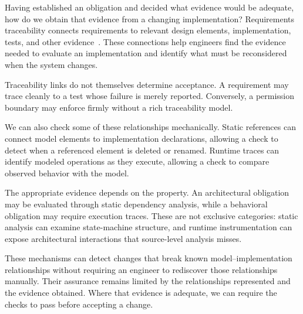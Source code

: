 Having established an obligation and decided what evidence would be adequate, how do we obtain that evidence from a changing implementation? Requirements traceability connects requirements to relevant design elements, implementation, tests, and other evidence~\citep{estefan2008mbse}. These connections help engineers find the evidence needed to evaluate an implementation and identify what must be reconsidered when the system changes.


Traceability links do not themselves determine acceptance. A requirement may trace cleanly to a test whose failure is merely reported. Conversely, a permission boundary may enforce firmly without a rich traceability model.


We can also check some of these relationships mechanically. Static references can connect model elements to implementation declarations, allowing a check to detect when a referenced element is deleted or renamed. Runtime traces can identify modeled operations as they execute, allowing a check to compare observed behavior with the model.

The appropriate evidence depends on the property. An architectural obligation may be evaluated through static dependency analysis, while a behavioral obligation may require execution traces. These are not exclusive categories: static analysis can examine state-machine structure, and runtime instrumentation can expose architectural interactions that source-level analysis misses.

These mechanisms can detect changes that break known model--implementation relationships without requiring an engineer to rediscover those relationships manually. Their assurance remains limited by the relationships represented and the evidence obtained. Where that evidence is adequate, we can require the checks to pass before accepting a change.

